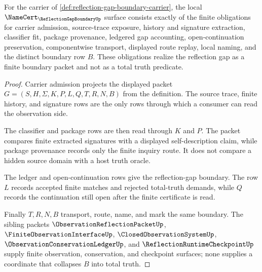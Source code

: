\begin{theorem}
\label{thm:reflection-gap-boundary-namecert-obligations}
For the carrier of \autoref{def:reflection-gap-boundary-carrier}, the local $\NameCert_{\ReflectionGapBoundaryUp}$ surface consists exactly of the finite obligations for carrier admission, source-trace exposure, history and signature extraction, classifier fit, package provenance, ledgered gap accounting, open-continuation preservation, componentwise transport, displayed route replay, local naming, and the distinct boundary row $B$. These obligations realize the reflection gap as a finite boundary packet and not as a total truth predicate.
\end{theorem}
\begin{proof}
Carrier admission projects the displayed packet $G=(S,H,\Sigma,K,P,L,Q,T,R,N,B)$ from the definition. The source trace, finite history, and signature rows are the only rows through which a consumer can read the observation side.

The classifier and package rows are then read through $K$ and $P$. The packet compares finite extracted signatures with a displayed self-description claim, while package provenance records only the finite inquiry route. It does not compare a hidden source domain with a host truth oracle.

The ledger and open-continuation rows give the reflection-gap boundary. The row $L$ records accepted finite matches and rejected total-truth demands, while $Q$ records the continuation still open after the finite certificate is read.

Finally $T,R,N,B$ transport, route, name, and mark the same boundary. The sibling packets $\ObservationReflectionPacketUp$, $\FiniteObservationInterfaceUp$, $\ClosedObservationSystemUp$, $\ObservationConservationLedgerUp$, and $\ReflectionRuntimeCheckpointUp$ supply finite observation, conservation, and checkpoint surfaces; none supplies a coordinate that collapses $B$ into total truth.
\end{proof}

